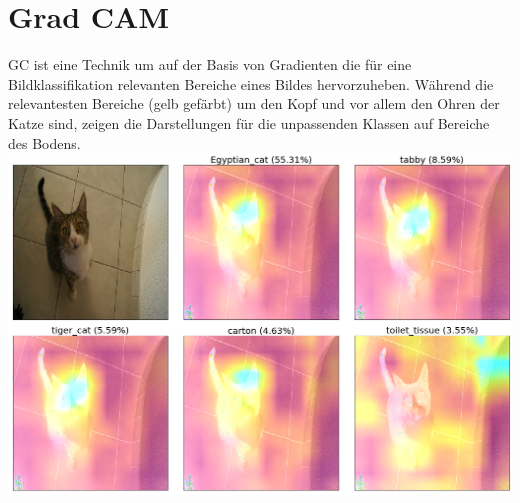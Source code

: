 \documentclass[
  12pt, %
  a4paper, %
  oneside, %
  openany, 
  numbers=noenddot, %
  BCOR=5mm, %
  parskip=half*, %
  thesis, %
]{bfhbook}
\begin{document}
\section{Grad CAM} \break
\Gls{GC} ist eine Technik \parencite{Selvaraju2016} um auf der Basis von Gradienten die für eine Bildklassifikation relevanten Bereiche eines Bildes hervorzuheben. Während die relevantesten Bereiche (gelb gefärbt) um den Kopf und vor allem den Ohren der Katze sind, zeigen die Darstellungen für die unpassenden Klassen auf Bereiche des Bodens.
\includegraphics[width=\textwidth]{Bilder/Grad-Cam-Classes.png}
\end{document}
